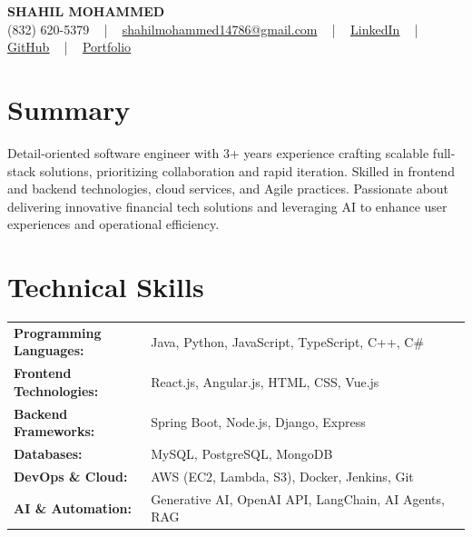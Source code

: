 \documentclass[letterpaper,11pt]{article}
\begin{document}
\begin{center}
    {\fontsize{14pt}{12pt}\selectfont \textbf{\MakeUppercase{Shahil Mohammed}}}\\ \vspace{2pt}
    \fontsize{10pt}{12pt}\selectfont (832) 620-5379 ~ | ~ \href{mailto:shahilmohammed14786@gmail.com}{shahilmohammed14786@gmail.com} ~ | ~  
    \href{https://www.linkedin.com/in/shahil-mohammed-9652931a1/}{\color{blue}\underline{LinkedIn}}  ~ | ~ 
    \href{https://github.com/freakbeast14}{\color{blue}\underline{GitHub}} ~ | ~ 
    \href{https://shahil-mohammed.netlify.app/}{\color{blue}\underline{Portfolio}}
    \vspace{-8pt}
\end{center}

\section{Summary}
\fontsize{9pt}{10pt}\selectfont
Detail-oriented software engineer with 3+ years experience crafting scalable full-stack solutions, prioritizing collaboration and rapid iteration. Skilled in frontend and backend technologies, cloud services, and Agile practices. Passionate about delivering innovative financial tech solutions and leveraging AI to enhance user experiences and operational efficiency.
 \vspace{-5pt}
 
\section{Technical Skills}
        \vspace{-14pt}
        \begin{table}[h]
            \fontsize{9pt}{10pt}\selectfont
            \begin{tabular}{p{0.3\linewidth} p{0.7\linewidth}}
                \textbf{Programming Languages:} & Java, Python, JavaScript, TypeScript, C++, C\# \\
                \textbf{Frontend Technologies:} & React.js, Angular.js, HTML, CSS, Vue.js \\
                \textbf{Backend Frameworks:} & Spring Boot, Node.js, Django, Express \\
                \textbf{Databases:} & MySQL, PostgreSQL, MongoDB \\
                \textbf{DevOps \& Cloud:} & AWS (EC2, Lambda, S3), Docker, Jenkins, Git \\
                \textbf{AI \& Automation:} & Generative AI, OpenAI API, LangChain, AI Agents, RAG \\
            \end{tabular}
        \end{table}
 \vspace{-15pt}
 
\end{document}
